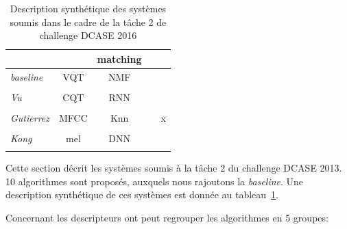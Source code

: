 \begin{table}[t]
\begin{center}
\begin{tabular}{lcccc}
\citep{Pikrakis2016}         &                              & matching             &           & \\ 
\hline
\emph{baseline}              &     VQT                      & NMF                  &           & \\ 
\citep{Benetos2016}          &                              &                      &           & \\ 
\hline
\emph{Vu}                    &     CQT                      & RNN                  &           & \\ 
\citep{Vu2016}               &                              &                      &           & \\ 
\hline
\emph{Gutierrez}             &     MFCC                     & Knn                  &           & x \\ 
\citep{GutierrezArriola2016} &                              &                      &           & \\ 
\hline
\emph{Kong}                  &     mel                      & DNN                  &           &  \\ 
\citep{Kong2016}             &                              &                      &           & \\ 
\hline   
\end{tabular}
\end{center}
\caption{Description synthétique des systèmes soumis dans le cadre de la tâche 2 de challenge DCASE 2016}
\label{tab:systemsDcase2016}
\end{table}

Cette section décrit les systèmes soumis à la tâche 2 du challenge DCASE 2013. 10 algorithmes sont proposés, auxquels nous rajoutons la \emph{baseline}. Une description synthétique de ces systèmes est donnée au tableau~\ref{tab:systemsDcase2016}. 

Concernant les descripteurs ont peut regrouper les algorithmes en 5 groupes:

